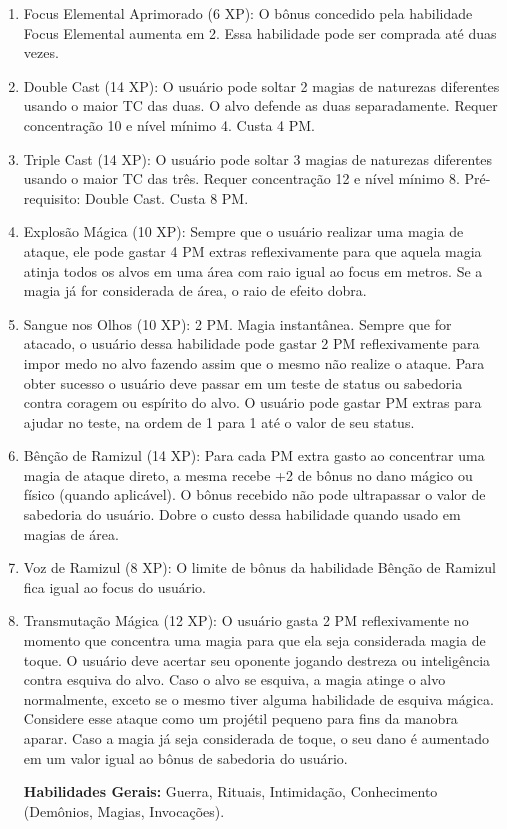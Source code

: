 \begin{enumerate}
 	\item Focus Elemental Aprimorado (6 XP): O bônus concedido pela habilidade Focus Elemental aumenta em 2. Essa habilidade pode ser comprada até duas vezes.
 	
 	\item Double Cast (14 XP): O usuário pode soltar 2 magias de naturezas diferentes usando o maior TC das duas. O alvo defende as duas separadamente. Requer concentração 10 e nível mínimo 4. Custa 4 PM.
 	
 	\item Triple Cast (14 XP): O usuário pode soltar 3 magias de naturezas diferentes usando o maior TC das três. Requer concentração 12 e nível mínimo 8. Pré-requisito: Double Cast. Custa 8 PM.

	\item	Explosão Mágica (10 XP): Sempre que o usuário realizar uma magia de ataque, ele pode gastar 4 PM extras reflexivamente para que aquela magia atinja todos os alvos em uma área com raio igual ao focus em metros. Se a magia já for considerada de área, o raio de efeito dobra.

	\item Sangue nos Olhos (10 XP): 2 PM. Magia instantânea.\newline
Sempre que for atacado, o usuário dessa habilidade pode gastar 2 PM reflexivamente para impor medo no alvo fazendo assim que o mesmo não realize o ataque. Para obter sucesso o usuário deve passar em um teste de status ou sabedoria contra coragem ou espírito do alvo. O usuário pode gastar PM extras para ajudar no teste, na ordem de 1 para 1 até o valor de seu status.

	\item Bênção de Ramizul (14 XP): Para cada PM extra gasto ao concentrar uma magia de ataque direto, a mesma recebe +2 de bônus no dano mágico ou físico (quando aplicável). O bônus recebido não pode ultrapassar o valor de sabedoria do usuário. Dobre o custo dessa habilidade quando usado em magias de área.
  	
  	\item Voz de Ramizul (8 XP): O limite de bônus da habilidade Bênção de Ramizul fica igual ao focus do usuário.
  	
 	\item Transmutação Mágica (12 XP): O usuário gasta 2 PM reflexivamente no momento que concentra uma magia para que ela seja considerada magia de toque. O usuário deve acertar seu oponente jogando destreza ou inteligência contra esquiva do alvo. Caso o alvo se esquiva, a magia atinge o alvo normalmente, exceto se o mesmo tiver alguma habilidade de esquiva mágica. Considere esse ataque como um projétil pequeno para fins da manobra aparar. Caso a magia já seja considerada de toque, o seu dano é aumentado em um valor igual ao bônus de sabedoria do usuário.
  	
\textbf{Habilidades Gerais:} Guerra, Rituais, Intimidação, Conhecimento (Demônios, Magias, Invocações).
 
\end{enumerate}
 

